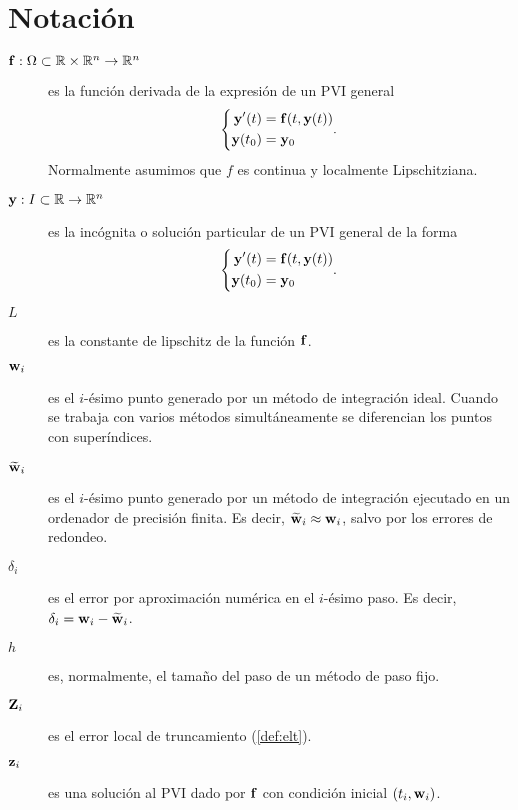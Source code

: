 \section{Notación}\label{sec:notation}

\begin{description}
    \item[$\vb{f}{} : \Omega \subset \mathbb{R} \times \mathbb{R}^n \to \mathbb{R}^n$] es la función
    derivada de la expresión de un PVI general
    \begin{equation*}
        \left\{
        \begin{aligned}
            \vb{y}{}'(t) &= \vb{f}{}(t, \vb{y}{}(t)) \\
            \vb{y}{}(t_0) &= \vb{y}{}_0 \\
        \end{aligned}.
        \right.
    \end{equation*}
    Normalmente asumimos que $f$ es continua y localmente Lipschitziana.

    \item[$\vb{y}{} : I \subset \mathbb{R} \to \mathbb{R}^n$] es la incógnita
    o solución particular de un PVI general de la forma
    \begin{equation*}
        \left\{
        \begin{aligned}
            \vb{y}{}'(t) &= \vb{f}{}(t, \vb{y}{}(t)) \\
            \vb{y}{}(t_0) &= \vb{y}{}_0 \\
        \end{aligned}.
        \right.
    \end{equation*}

    \item[$L$] es la constante de lipschitz de la función $\vb{f}{}$.

    \item[$\vb{w}{}_i$] es el $i$-ésimo punto generado por
    un método de integración ideal.
    Cuando se trabaja con varios métodos simultáneamente
    se diferencian los puntos con superíndices.

    \item[$\vb{\widetilde{w}}{}_i$] es el $i$-ésimo punto generado por
    un método de integración ejecutado en un ordenador de precisión finita.
    Es decir, $\vb{\widetilde{w}}{}_i \approx \vb{w}{}_i$, salvo por los errores de redondeo.

    \item[$\delta_i$] es el error por aproximación numérica en el $i$-ésimo paso.
    Es decir, $\delta_i = \vb{w}{}_i - \vb{\widetilde{w}}{}_i$.

    \item[$h$] es, normalmente, el tamaño del paso de un método de paso fijo.
    
    \item[$\vb{Z}{}_i$] es el error local de truncamiento (\cref{def:elt}).

    \item[$\vb{z}{}_i$] es una solución al PVI dado por
    $\vb{f}{}$ con condición inicial $(t_i, \vb{w}{}_i)$.
\end{description}
